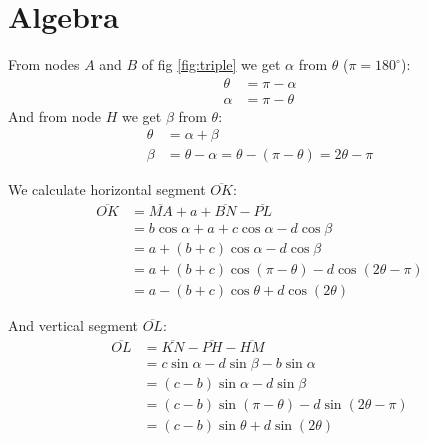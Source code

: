 \documentclass[11pt]{article}
\begin{document}
\section{Algebra}

From nodes $A$ and $B$ of fig \ref{fig:triple} we get $\alpha$ from $\theta$ ($\pi = 180^\circ$):
\begin{align}
\theta &= \pi - \alpha \nonumber\\
\alpha &= \pi - \theta
\end{align}
And from node $H$ we get $\beta$ from $\theta$:
\begin{align}
\theta &= \alpha + \beta \nonumber\\
\beta &= \theta - \alpha = \theta - (\pi - \theta) = 2\theta - \pi
\end{align}

We calculate horizontal segment $\overline{OK}$:
\begin{align}
\overline{OK} &= \overline{MA} + a + \overline{BN} - \overline{PL} \nonumber\\
 &= b\cos{\alpha} + a + c\cos{\alpha} - d\cos{\beta} \nonumber\\
 &= a + (b+c)\cos{\alpha} - d\cos{\beta} \nonumber\\
 &= a + (b+c)\cos{(\pi-\theta)} - d\cos{(2\theta - \pi)} \nonumber\\
 &= a - (b+c)\cos{\theta} + d\cos{(2\theta)}
\end{align} 

And vertical segment $\overline{OL}$:
\begin{align}
\overline{OL} &= \overline{KN} - \overline{PH} - \overline{HM} \nonumber\\
 &= c\sin{\alpha} - d\sin{\beta} - b\sin{\alpha} \nonumber\\
 &= (c-b)\sin{\alpha} - d\sin{\beta} \nonumber\\
 &= (c-b)\sin{(\pi-\theta)} - d\sin{(2\theta-\pi)} \nonumber\\
 &= (c-b)\sin{\theta} + d\sin{(2\theta)}
\end{align}
\end{document}
